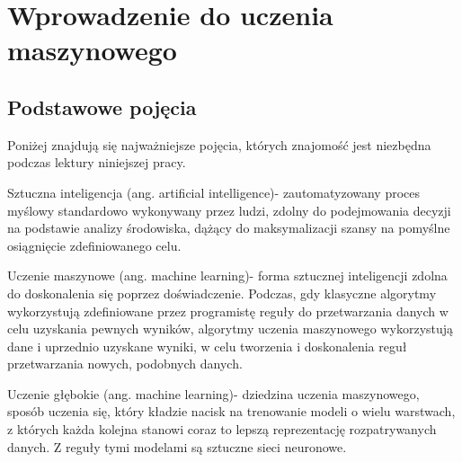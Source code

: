 \chapter{Wprowadzenie do uczenia maszynowego}
\thispagestyle{chapterBeginStyle}
\label{chapter2}


\section{Podstawowe pojęcia}
Poniżej znajdują się najważniejsze pojęcia, których znajomość jest niezbędna podczas lektury niniejszej pracy.

Sztuczna inteligencja (ang. artificial intelligence)- zautomatyzowany proces myślowy standardowo wykonywany przez ludzi, zdolny do podejmowania decyzji na podstawie analizy środowiska, dążący do maksymalizacji szansy na pomyślne osiągnięcie zdefiniowanego celu.

Uczenie maszynowe (ang. machine learning)- forma sztucznej inteligencji zdolna do doskonalenia się poprzez doświadczenie. Podczas, gdy klasyczne algorytmy wykorzystują zdefiniowane przez programistę reguły do przetwarzania danych w celu uzyskania pewnych wyników, algorytmy uczenia maszynowego wykorzystują dane i uprzednio uzyskane wyniki, w celu tworzenia i doskonalenia reguł przetwarzania nowych, podobnych danych.

Uczenie głębokie (ang. machine learning)- dziedzina uczenia maszynowego, sposób uczenia się, który kładzie nacisk na trenowanie modeli o wielu warstwach, z których każda kolejna stanowi coraz to lepszą reprezentację rozpatrywanych danych. Z reguły tymi modelami są sztuczne sieci neuronowe.

